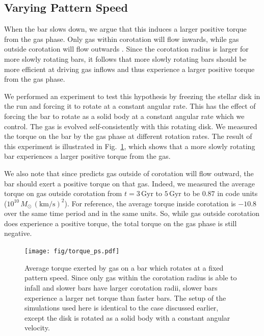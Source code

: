 \begin{appendices}
\section{Varying Pattern Speed}
\label{ch2:app:varyps}
When the bar slows down, we argue that this induces a larger positive torque
from the gas phase. Only gas within corotation will flow inwards, while gas
outside corotation will flow outwards \citep{2011MNRAS.415.1027H}. Since the
corotation radius is larger for more slowly rotating bars, it follows that
more slowly rotating bars should be more efficient at driving gas inflows and
thus experience a larger positive torque from the gas phase.

We performed an experiment to test this hypothesis by freezing the stellar
disk in the \SMUGGLE{} run and forcing it to rotate at a constant angular rate.
This has the effect of forcing the bar to rotate as a solid body at a constant
angular rate which we control. The gas is evolved self-consistently with this
rotating disk. We measured the torque on the bar by the gas phase at different
rotation rates. The result of this experiment is illustrated in
Fig.~\ref{fig:equil}, which shows that a more slowly rotating bar experiences a
larger positive torque from the gas.

We also note that since \citet{2011MNRAS.415.1027H} predicts gas outside of
corotation will flow outward, the bar should exert a positive torque on that
gas. Indeed, we measured the average torque on gas outside corotation from
$t=3\,\textrm{Gyr}$ to $5\,\textrm{Gyr}$ to be $0.87$ in code units
($10^{10}\,M_{\odot}\,(\text{km}/\text{s})^2$). For reference, the average
torque inside corotation is $-10.8$ over the same time period and in the same
units. So, while gas outside corotation does experience a positive torque, the
total torque on the gas phase is still negative.

\begin{figure}
    \centering
    \texttt{[image: fig/torque\_ps.pdf]}
    \caption{Average torque exerted by gas on a bar which rotates at a fixed
    pattern speed. Since only gas within the corotation radius is able to infall
    and slower bars have larger corotation radii, slower bars experience a
    larger net torque than faster bars. The setup of the simulations used here
    is identical to the \SMUGGLE{} case discussed earlier, except the \Nbody{} disk
    is rotated as a solid body with a constant angular
    velocity.}
    \label{fig:equil}
\end{figure}


\end{appendices}
